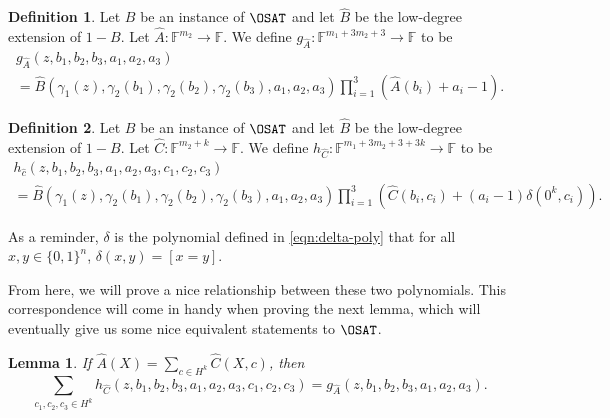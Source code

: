 \documentclass[english,12pt]{reedthesis}
\theoremstyle{plain}
\newtheorem{lemma}[lemma]{Lemma}
\theoremstyle{definition}
\newtheorem{defn}[defn]{Definition}
\theoremstyle{remark}
\begin{document}
\begin{defn}\label{def:g_a}
  Let $B$ be an instance of $\OSAT$ and let $\hat{B}$ be the low-degree
  extension of $1 - B$. Let $\hat{A}\colon \mathbb{F}^{m_{2}} \rightarrow \mathbb{F}$. We
  define $g_{\hat{A}}\colon \mathbb{F}^{m_{1} + 3m_{2} + 3} \rightarrow \mathbb{F}$ to be
  \begin{multline}
    g_{\hat{A}}(z, b_{1}, b_{2}, b_{3}, a_{1}, a_{2}, a_{3}) \\ =
    \hat{B}(\gamma_{1}(z), \gamma_{2}(b_{1}), \gamma_{2}(b_{2}), \gamma_{2}(b_{3}), a_{1}, a_{2}, a_{3})
    \prod_{i=1}^{3}(\hat{A}(b_{i}) + a_{i} - 1).
  \end{multline}
\end{defn}

\begin{defn}\label{def:h_c}
  Let $B$ be an instance of $\OSAT$ and let $\hat{B}$ be the low-degree
  extension of $1 - B$. Let $\hat{C}\colon \mathbb{F}^{m_{2} + k} \rightarrow \mathbb{F}$.
  We define
  $h_{\hat{C}}\colon \mathbb{F}^{m_{1} + 3m_{2} + 3 + 3k} \rightarrow \mathbb{F}$ to be
  \begin{multline}
    h_{\hat{c}}(z, b_{1}, b_{2}, b_{3}, a_{1}, a_{2}, a_{3}, c_{1}, c_{2}, c_{3}) \\ =
    \hat{B}(\gamma_{1}(z), \gamma_{2}(b_{1}), \gamma_{2}(b_{2}), \gamma_{2}(b_{3}), a_{1}, a_{2}, a_{3})
    \prod_{i=1}^{3}(\hat{C}(b_{i}, c_{i}) + (a_{i} - 1)\delta(0^{k}, c_{i})).
  \end{multline}
\end{defn}

As a reminder, $\delta$ is the polynomial defined in \cref{eqn:delta-poly} that for
all $x, y \in \{0, 1\}^{n}$, $\delta(x, y) = [x = y]$.

From here, we will prove a nice relationship between these two polynomials.
This correspondence will come in handy when proving the next lemma, which will
eventually give us some nice equivalent statements to $\OSAT$.

\begin{lemma}\label{lem:g_a-vs-h_c}
  If $\hat{A}(X) = \sum_{c \in H^{k}}\hat{C}(X, c)$, then
  \begin{equation}\label{eqn:g_a-vs-h_c}
    \sum_{c_{1}, c_{2}, c_{3} \in H^{k}}h_{\hat{C}}(z, b_{1}, b_{2}, b_{3}, a_{1}, a_{2}, a_{3}, c_{1}, c_{2}, c_{3})
    = g_{\hat{A}}(z, b_{1}, b_{2}, b_{3}, a_{1}, a_{2}, a_{3}).
  \end{equation}
\end{lemma}
\end{document}
